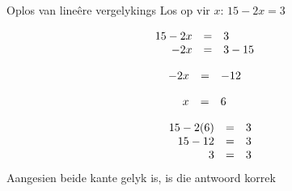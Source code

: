     
\begin{wex}{Oplos van lineêre vergelykings}
{
Los op vir $x$: $15-2x=3$
}
{

\begin{equation*}
    \begin{array}{cclc}\hfill 15-2x& =& 3\hfill & \\
	    \hfill -2x& =& 3-15\hfill & \hfill 
	    
    \end{array}
\end{equation*}

\begin{equation*}
    \begin{array}{cccc}\hfill -2x& =&-12\hfill & 
	    
    \end{array}
\end{equation*}

\begin{equation*}
    \begin{array}{cccc}\hfill x& =&6\hfill & 
	    
    \end{array}
\end{equation*}

\begin{equation*}
\begin{array}{ccc}\hfill 15 - 2(6)& =& 3\hfill \\
 \hfill 15-12& =& 3\hfill \\
\hfill 3 &=& 3\hfill
\end{array}
\end{equation*}
Aangesien beide kante gelyk is, is die antwoord korrek
}
\end{wex}

